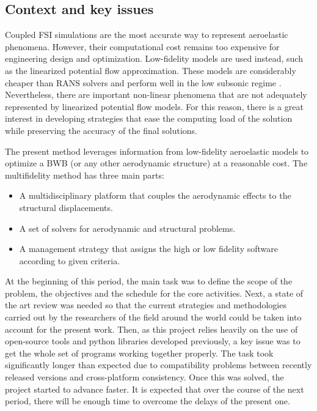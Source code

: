 \subsection{Context and key issues}
Coupled FSI simulations are the most accurate way to represent aeroelastic phenomena. However, their computational cost  remains too expensive for engineering design and optimization. Low-fidelity models are used instead, such as the linearized potential flow approximation. These models are considerably cheaper than RANS solvers and perform well in the low subsonic regime \cite{Marques2019}. Nevertheless, there are important non-linear phenomena that are not adequately represented by linearized potential flow models. For this reason, there is a great interest in developing strategies that ease the computing load of the solution while preserving the accuracy of the final solutions. \par
The present method leverages information from low-fidelity aeroelastic models to optimize a BWB (or any other aerodynamic structure) at a reasonable cost. The multifidelity method has three main parts: 
\begin{itemize}
    \item A multidisciplinary platform that couples the aerodynamic effects to the structural displacements.
    \item A set of solvers for aerodynamic and structural problems.
    \item A management strategy that assigns the high or low fidelity software according to given criteria.
\end{itemize}\par
At the beginning of this period, the main task was to define the scope of the problem, the objectives and the schedule for the core activities. Next, a state of the art review was needed so that the current strategies and methodologies carried out by the researchers of the field around the world could be taken into account for the present work. Then, as this project relies heavily on the use of open-source tools and python libraries developed previously, a key issue was to get the whole set of programs working together properly. The task took significantly longer than expected due to compatibility problems between recently released versions and cross-platform consistency. Once this was solved, the project started to advance faster. It is expected that over the course of the next period, there will be enough time to overcome the delays of the present one. 


